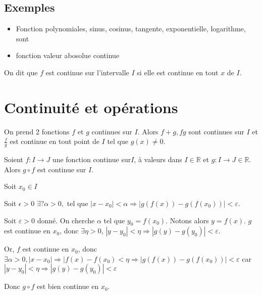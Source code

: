 \documentclass[french]{yLectureNote}
\begin{document}
\subsection{Exemples}
\begin{itemize}
 \item Fonction polynomiales, sinus, cosinus, tangente, exponentielle, logarithme, sont
 \item fonction valeur abosolue continue
\end{itemize}

On dit que $f$ est continue sur l'intervalle $I$ si elle est continue en tout $x$ de $I$.
\section{Continuité et opérations}
On prend 2 fonctions $f$ et $g$ continues sur $I$. Alors $f+g, fg$ sont continues sur $I$ et $\frac{f}{g}$ est continue en tout point de $I$ tel que $g(x)\neq 0$.

\begin{theorem}
Soient $f : I\to J$ une fonction continue sur$I$, à valeurs dans $I\in\mathbb{R}$ et $g:I\to J\in\mathbb{R}$. Alors $g\circ f$ est continue sur $I$.
\end{theorem}
\begin{myproof}
Soit $x_0\in I$

Soit $\epsilon >0$ $\exists ? \alpha >0,$ tel que $|x-x_0| < \alpha \Rightarrow |g(f(x)) - g(f(x_0))|<\varepsilon$.

Soit $\varepsilon >0$ donné. On cherche $\alpha$ tel que $y_0 = f(x_0)$. Notons alors $y=f(x)$. $g$ est continue en $x_0$, donc $\exists \eta >0$, $|y-y_0|<\eta \Rightarrow |g(y)-g(y_0)|<\varepsilon$.

Or, $f$ est continue en $x_0$, donc $\exists \alpha >0, |x-x_0| \Rightarrow |f(x)-f(x_0) < \eta \Rightarrow |g(f(x))-g(f(x_0))| < \varepsilon$ car $|y-y_0|<\eta \Rightarrow |g(y)-g(y_0)|<\varepsilon$

Donc $g\circ f$ est bien continue en $x_0$.
\end{myproof}
\end{document}
